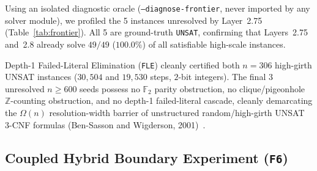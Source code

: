 \documentclass[11pt]{article}
\begin{document}
Using an isolated diagnostic oracle (\texttt{--diagnose-frontier}, never imported by any solver module), we profiled the 5 instances unresolved by Layer~2.75 (Table~\ref{tab:frontier}). All 5 are ground-truth \texttt{UNSAT}, confirming that Layers~2.75 and~2.8 already solve $49/49$ ($100.0\%$) of all satisfiable high-scale instances.

\begin{table}[t]
\centering
\caption{Diagnostic dissection of the 5 frontier seeds and Layer~2.8 closure. \texttt{GT}: ground truth; \texttt{Fix\%}: root-fixed variables; \texttt{Froz\%}: SP-frozen variables; \texttt{Depth}: mean conflict depth.}
\label{tab:frontier}
\end{table}

Depth-1 Failed-Literal Elimination (\texttt{FLE}) cleanly certified both $n=306$ high-girth UNSAT instances ($30{,}504$ and $19{,}530$ steps, $2$-bit integers). The final 3 unresolved $n \ge 600$ seeds possess no $\mathbb{F}_2$ parity obstruction, no clique/pigeonhole $\mathbb{Z}$-counting obstruction, and no depth-1 failed-literal cascade, cleanly demarcating the $\Omega(n)$ resolution-width barrier of unstructured random/high-girth UNSAT 3-CNF formulas (Ben-Sasson and Wigderson, 2001)~\cite{bensasson2001}.

\subsection{Coupled Hybrid Boundary Experiment (\texttt{F6})}
\end{document}
